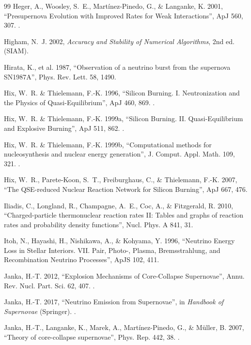 \begin{thebibliography}{99}
Heger, A., Woosley, S.~E., Martínez-Pinedo, G., \& Langanke, K. 2001,
``Presupernova Evolution with Improved Rates for Weak Interactions'', ApJ 560,
307. .

Higham, N.~J. 2002, \emph{Accuracy and Stability of Numerical Algorithms}, 2nd
ed. (SIAM).

Hirata, K., et al. 1987, ``Observation of a neutrino burst from the supernova
SN1987A'', Phys. Rev. Lett. 58, 1490.

Hix, W.~R. \& Thielemann, F.-K. 1996, ``Silicon Burning. I. Neutronization and
the Physics of Quasi-Equilibrium'', ApJ 460, 869. .

Hix, W.~R. \& Thielemann, F.-K. 1999a, ``Silicon Burning. II.
Quasi-Equilibrium and Explosive Burning'', ApJ 511, 862.
.

Hix, W.~R. \& Thielemann, F.-K. 1999b, ``Computational methods for
nucleosynthesis and nuclear energy generation'', J. Comput. Appl. Math. 109,
321. .

Hix, W.~R., Parete-Koon, S.~T., Freiburghaus, C., \& Thielemann, F.-K. 2007,
``The QSE-reduced Nuclear Reaction Network for Silicon Burning'', ApJ 667,
476.

Iliadis, C., Longland, R., Champagne, A.~E., Coc, A., \& Fitzgerald, R. 2010,
``Charged-particle thermonuclear reaction rates II: Tables and graphs of
reaction rates and probability density functions'', Nucl. Phys. A 841, 31.

Itoh, N., Hayashi, H., Nishikawa, A., \& Kohyama, Y. 1996, ``Neutrino Energy
Loss in Stellar Interiors. VII. Pair, Photo-, Plasma, Bremsstrahlung, and
Recombination Neutrino Processes'', ApJS 102, 411.

Janka, H.-T. 2012, ``Explosion Mechanisms of Core-Collapse Supernovae'', Annu.
Rev. Nucl. Part. Sci. 62, 407. .

Janka, H.-T. 2017, ``Neutrino Emission from Supernovae'', in \emph{Handbook of
Supernovae} (Springer). .

Janka, H.-T., Langanke, K., Marek, A., Martínez-Pinedo, G., \& Müller, B.
2007, ``Theory of core-collapse supernovae'', Phys. Rep. 442, 38.
.


\end{thebibliography}
